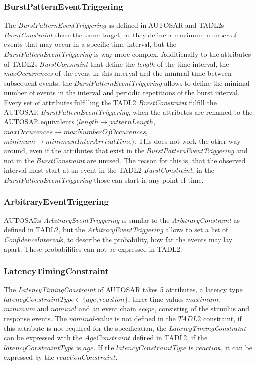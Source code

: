 	\subsubsection{BurstPatternEventTriggering}
		The \emph{BurstPatternEventTriggering} as defined in AUTOSAR and TADL2s \emph{BurstConstraint} share the same target, as they define a maximum number of events that may occur in a specific time interval, but the \emph{BurstPatternEventTriggering} is way more complex. Additionally to the attributes of TADL2s \emph{BurstConstraint} that define the \emph{length} of the time interval, the \emph{maxOccurrences} of the event in this interval and the minimal time between subsequent events, the \emph{BurstPatternEventTriggering} allows to define the minimal number of events in the interval and periodic repetitions of the burst interval.\\
		Every set of attributes fulfilling the TADL2 \emph{BurstConstraint} fulfill the AUTOSAR \emph{BurstPatternEventTriggering}, when the attributes are renamed to the AUTOSAR equivalents ($length\rightarrow patternLength$, $maxOccurences\rightarrow maxNumberOfOccurences$, $minimum\rightarrow minimumInterArrivalTime$). This does not work the other way around, even if the attributes that exist in the \emph{BurstPatternEventTriggering} and not in the \emph{BurstConstraint} are unused. The reason for this is, that the observed interval must start at an event in the TADL2 \emph{BurstConstraint}, in the \emph{BurstPatternEventTriggering} those can start in any point of time.
		
	\subsubsection{ArbitraryEventTriggering}
		AUTOSARs \emph{ArbitraryEventTriggering} is similar to the \emph{ArbitraryConstraint} as defined in TADL2, but the \emph{ArbitraryEventTriggering} allows to set a list of \emph{ConfidenceInterval}s, to describe the probability, how far the events may lay apart. These probabilities can not be expressed in TADL2.
		
	\subsubsection{LatencyTimingConstraint}
		The \emph{LatencyTimingConstraint} of AUTOSAR takes 5 attributes, a latency type $latencyConstraintType\in \{age, reaction\}$, three time values $maximum$, $minimum$ and $nominal$ and an event chain $scope$, consisting of the stimulus and response events. The $nominal$-value is not defined in the $TADL2$ constraint, if this attribute is not required for the specification, the \emph{LatencyTimingConstraint} can be expressed with the $AgeConstraint$ defined in TADL2, if the $latencyConstraintType$ is $age$. If  the $latencyConstraintType$ is $reaction$, it can be expressed by the $reactionConstraint$.
	
